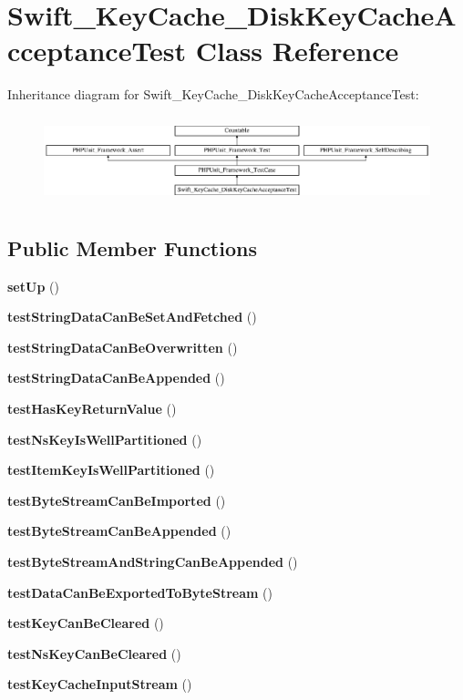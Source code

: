 \section{Swift\+\_\+\+Key\+Cache\+\_\+\+Disk\+Key\+Cache\+Acceptance\+Test Class Reference}
\label{class_swift___key_cache___disk_key_cache_acceptance_test}
Inheritance diagram for Swift\+\_\+\+Key\+Cache\+\_\+\+Disk\+Key\+Cache\+Acceptance\+Test\+:\begin{figure}[H]
\begin{center}
\leavevmode
\includegraphics[height=2.539683cm]{class_swift___key_cache___disk_key_cache_acceptance_test}
\end{center}
\end{figure}
\subsection*{Public Member Functions}
\begin{DoxyCompactItemize}
\item 
{\bf set\+Up} ()
\item 
{\bf test\+String\+Data\+Can\+Be\+Set\+And\+Fetched} ()
\item 
{\bf test\+String\+Data\+Can\+Be\+Overwritten} ()
\item 
{\bf test\+String\+Data\+Can\+Be\+Appended} ()
\item 
{\bf test\+Has\+Key\+Return\+Value} ()
\item 
{\bf test\+Ns\+Key\+Is\+Well\+Partitioned} ()
\item 
{\bf test\+Item\+Key\+Is\+Well\+Partitioned} ()
\item 
{\bf test\+Byte\+Stream\+Can\+Be\+Imported} ()
\item 
{\bf test\+Byte\+Stream\+Can\+Be\+Appended} ()
\item 
{\bf test\+Byte\+Stream\+And\+String\+Can\+Be\+Appended} ()
\item 
{\bf test\+Data\+Can\+Be\+Exported\+To\+Byte\+Stream} ()
\item 
{\bf test\+Key\+Can\+Be\+Cleared} ()
\item 
{\bf test\+Ns\+Key\+Can\+Be\+Cleared} ()
\item 
{\bf test\+Key\+Cache\+Input\+Stream} ()
\end{DoxyCompactItemize}
